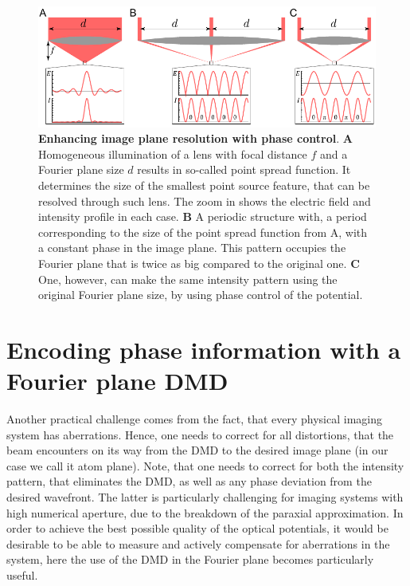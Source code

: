 \begin{figure}[t]
	\centering
	\includegraphics[scale=1]{figures/DMD_lens.pdf}
	\caption{{\bf Enhancing image plane resolution with phase control}. {\bf A} Homogeneous illumination of a lens with focal distance $f$ and a Fourier plane size $d$ results in so-called point spread function. It determines the size of the smallest point source feature, that can be resolved through such lens. The zoom in shows the electric field and intensity profile in each case. {\bf B} A periodic structure with, a period corresponding to the size of the point spread function from A, with a constant phase in the image plane. This pattern occupies the Fourier plane that is twice as big compared to the original one. {\bf C} One, however, can make the same intensity pattern using the original Fourier plane size, by using phase control of the potential.}
	\label{fig:DMD_lens}
\end{figure}

\section{Encoding phase information with a Fourier plane DMD}
Another practical challenge comes from the fact, that every physical imaging system has aberrations. Hence, one needs to correct for all distortions, that the beam encounters on its way from the DMD to the desired image plane (in our case we call it atom plane). Note, that one needs to correct for both the intensity pattern, that eliminates the DMD, as well as any phase deviation from the desired wavefront. The latter is particularly challenging for imaging systems with high numerical aperture, due to the breakdown of the paraxial approximation. In order to achieve the best possible quality of the optical potentials, it would be desirable to be able to measure and actively compensate for aberrations in the system, here the use of the DMD in the Fourier plane becomes particularly useful.

